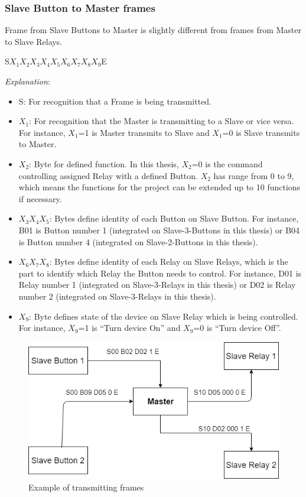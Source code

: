     \subsubsection{Slave Button to Master frames}
    Frame from Slave Buttons to Master is slightly different from frames from Master to Slave Relays.

        \begin{center}
        S$X_1$$X_2$$X_3$$X_4$$X_5$$X_6$$X_7$$X_8$$X_9$E
        \end{center}

    \textit{Explanation}:
    \begin{itemize}
    \item S: For recognition that a Frame is being transmitted.
    \item $X_1$: For recognition that the Master is transmitting to a Slave or vice versa. For instance, $X_1$=1 is Master transmits to Slave and $X_1$=0 is Slave transmits to Master.
    \item $X_2$: Byte for defined function. In this thesis, $X_2$=0 is the command controlling assigned Relay with a defined Button. $X_2$ has range from 0 to 9, which means the functions for the project can be extended up to 10 functions if necessary. 
    \item $X_3$$X_4$$X_5$: Bytes define identity of each Button on Slave Button. For instance, B01 is Button number 1 (integrated on Slave-3-Buttons in this thesis) or B04 is Button number 4 (integrated on Slave-2-Buttons in this thesis).
    \item $X_6$$X_7$$X_8$: Bytes define identity of each Relay on Slave Relays, which is the part to identify which Relay the Button needs to control. For instance, D01 is Relay number 1 (integrated on Slave-3-Relays in this thesis) or D02 is Relay number 2 (integrated on Slave-3-Relays in this thesis).
    \item $X_9$: Byte defines state of the device on Slave Relay which is being controlled. For instance, $X_9$=1 is “Turn device On” and $X_9$=0 is “Turn device Off”.
    \end{itemize}

    \begin{figure}[!h]
        \begin{center}
        \includegraphics[scale=0.75]{images/frameEx.png}
        \caption{Example of transmitting frames}
        \label{fig:frameEx}
        \end{center}
    \end{figure}

